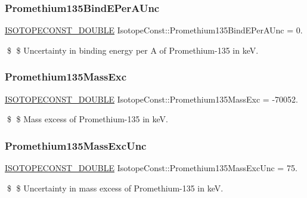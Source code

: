 \subsubsection{\texorpdfstring{Promethium135\+Bind\+E\+Per\+A\+Unc}{Promethium135BindEPerAUnc}}
{\footnotesize\ttfamily \mbox{\hyperlink{group___isotope_const-_macros_ga8f45a7272ce02c0b4c65c44636ed719a}{I\+S\+O\+T\+O\+P\+E\+C\+O\+N\+S\+T\+\_\+\+D\+O\+U\+B\+LE}} Isotope\+Const\+::\+Promethium135\+Bind\+E\+Per\+A\+Unc = 0.}

\$ \$ Uncertainty in binding energy per A of Promethium-\/135 in keV. \mbox{\label{group___isotope_const-_promethium-_pm135_ga00820983401e6d86ffb165fb0806e308}} 
\subsubsection{\texorpdfstring{Promethium135\+Mass\+Exc}{Promethium135MassExc}}
{\footnotesize\ttfamily \mbox{\hyperlink{group___isotope_const-_macros_ga8f45a7272ce02c0b4c65c44636ed719a}{I\+S\+O\+T\+O\+P\+E\+C\+O\+N\+S\+T\+\_\+\+D\+O\+U\+B\+LE}} Isotope\+Const\+::\+Promethium135\+Mass\+Exc = -\/70052.}

\$ \$ Mass excess of Promethium-\/135 in keV. \mbox{\label{group___isotope_const-_promethium-_pm135_ga6f98633ad0066580e66981f97fb5e16e}} 
\subsubsection{\texorpdfstring{Promethium135\+Mass\+Exc\+Unc}{Promethium135MassExcUnc}}
{\footnotesize\ttfamily \mbox{\hyperlink{group___isotope_const-_macros_ga8f45a7272ce02c0b4c65c44636ed719a}{I\+S\+O\+T\+O\+P\+E\+C\+O\+N\+S\+T\+\_\+\+D\+O\+U\+B\+LE}} Isotope\+Const\+::\+Promethium135\+Mass\+Exc\+Unc = 75.}

\$ \$ Uncertainty in mass excess of Promethium-\/135 in keV. \mbox{\label{group___isotope_const-_promethium-_pm135_ga27c557631f6b8aefa6d8d7ffdb8e8cdb}} 
